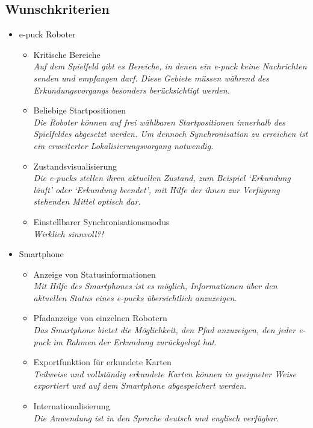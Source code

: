 \documentclass[10pt,a4paper]{article}
\begin{document}
		\subsection{Wunschkriterien}
			\begin{itemize}
				\item e-puck Roboter
				\begin{itemize}
					\item Kritische Bereiche
						\\ \textsl{Auf dem Spielfeld gibt es Bereiche, in denen ein e-puck keine Nachrichten senden
							und empfangen darf. Diese Gebiete müssen während des Erkundungsvorgangs besonders berücksichtigt
							werden.}											
					\item Beliebige Startpositionen
						\\ \textsl{Die Roboter können auf frei wählbaren Startpositionen innerhalb des Spielfeldes
							abgesetzt werden. Um dennoch Synchronisation zu erreichen ist ein erweiterter Lokalisierungsvorgang
							notwendig.}
					\item Zustandsvisualisierung
						\\ \textsl{Die e-pucks stellen ihren aktuellen Zustand, zum Beispiel `Erkundung läuft' oder `Erkundung
							beendet', mit Hilfe der ihnen zur Verfügung stehenden Mittel optisch dar.}												
					\item Einstellbarer Synchronisationsmodus
						\\ \textsl{Wirklich sinnvoll?!}		
				\end{itemize}
				\item Smartphone
				\begin{itemize}
					\item Anzeige von Statusinformationen
						\\ \textsl{Mit Hilfe des Smartphones ist es möglich, Informationen über den aktuellen Status eines e-pucks
							übersichtlich anzuzeigen.}		
					\item Pfadanzeige von einzelnen Robotern
						\\ \textsl{Das Smartphone bietet die Möglichkeit, den Pfad anzuzeigen, den jeder e-puck im Rahmen der
							Erkundung zurückgelegt hat.}							
					\item Exportfunktion für erkundete Karten
						\\ \textsl{Teilweise und vollständig erkundete Karten können in geeigneter Weise exportiert und auf dem
							Smartphone abgespeichert werden.}		
					\item Internationalisierung
						\\ \textsl{Die Anwendung ist in den Sprache deutsch und englisch verfügbar.}									
				\end{itemize}
			\end{itemize}
\end{document}
